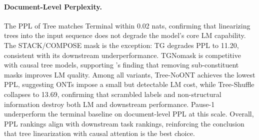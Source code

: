 \documentclass[11pt]{article}
\begin{document}
\paragraph{Document-Level Perplexity.}
The PPL of Tree matches Terminal within 0.02 nats, confirming that linearizing trees into the input sequence does not degrade the model's core LM capability.
The STACK/COMPOSE mask is the exception: TG degrades PPL to 11.20, consistent with its downstream underperformance.
TGNomask is competitive with causal tree models, supporting \citet{zhao-etal-2025-systematic}'s finding that removing sub-constituent masks improves LM quality.
Among all variants, Tree-NoONT achieves the lowest PPL, suggesting ONTs impose a small but detectable LM cost, while Tree-Shuffle collapses to 13.69, confirming that scrambled labels and non-structural information destroy both LM and downstream performance.
Pause-1 underperform the terminal baseline on document-level PPL at this scale.
Overall, PPL rankings align with downstream task rankings, reinforcing the conclusion that tree linearization with causal attention is the best choice.

\end{document}
